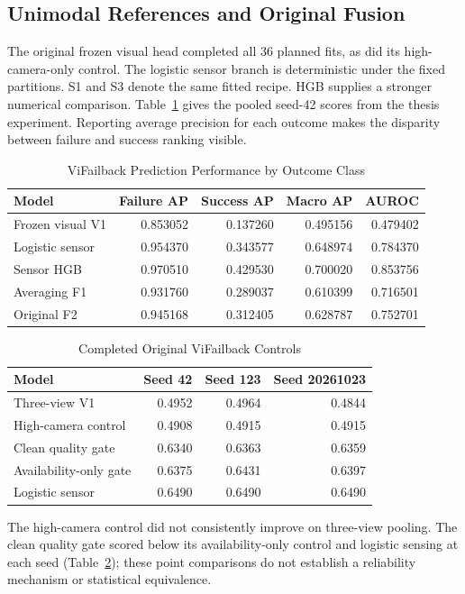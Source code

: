 \subsection{Unimodal References and Original Fusion}
The original frozen visual head completed all 36 planned fits, as did its
high-camera-only control. The logistic sensor branch is deterministic under the fixed
partitions. S1 and S3 denote the same fitted recipe. HGB supplies a stronger numerical
comparison. Table~\ref{tab:vif-bothclass} gives the pooled seed-42 scores from the
thesis experiment. Reporting average precision for each outcome makes the disparity
between failure and success ranking visible.

\begin{table}[htbp]
\caption{ViFailback Prediction Performance by Outcome Class}\label{tab:vif-bothclass}
\centering\small

\begin{tabular}{lrrrr}\hline Model&Failure AP&Success AP&Macro AP&AUROC\\\hline
Frozen visual V1&0.853052&0.137260&0.495156&0.479402\\
Logistic sensor&0.954370&0.343577&0.648974&0.784370\\
Sensor HGB&0.970510&0.429530&0.700020&0.853756\\
Averaging F1&0.931760&0.289037&0.610399&0.716501\\
Original F2&0.945168&0.312405&0.628787&0.752701\\\hline
\end{tabular}
\end{table}

\begin{table}[htbp]
\caption{Completed Original ViFailback Controls}\label{tab:vif-controls}
\centering\small
\begin{tabular}{lrrr}\toprule
Model & Seed 42 & Seed 123 & Seed 20261023\\\midrule
Three-view V1 & 0.4952 & 0.4964 & 0.4844\\
High-camera control & 0.4908 & 0.4915 & 0.4915\\
Clean quality gate & 0.6340 & 0.6363 & 0.6359\\
Availability-only gate & 0.6375 & 0.6431 & 0.6397\\
Logistic sensor & 0.6490 & 0.6490 & 0.6490\\
\bottomrule\end{tabular}
\end{table}
The high-camera control did not consistently improve on three-view pooling. The clean
quality gate scored below its availability-only control and logistic sensing at each
seed (Table~\ref{tab:vif-controls}); these point comparisons do not establish a
reliability mechanism or statistical equivalence.

